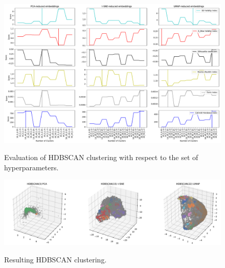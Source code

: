 \begin{figure}[!ht]
	\centering
	\includegraphics[width=1.0\textwidth]{images/appendix/App11.pdf}\\
	\caption{Evaluation of HDBSCAN clustering with respect to the set of hyperparameters.}
	\label{fig:App11}
\end{figure}
\begin{figure}[!ht]
	\centering
	\includegraphics[width=1.0\textwidth]{images/appendix/App12.pdf}\\
	\caption{Resulting HDBSCAN clustering.}
	\label{fig:App12}
\end{figure}

